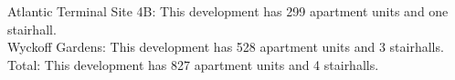 {Atlantic Terminal Site 4B}: This development has 299 apartment units and one stairhall.\\{Wyckoff Gardens}: This development has 528 apartment units and 3 stairhalls.\\{Total}: This development has 827 apartment units and 4 stairhalls.\\